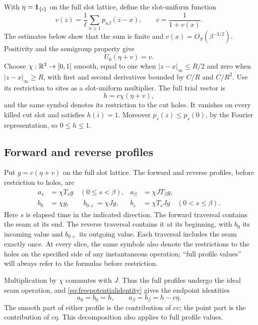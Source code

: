With $\eta=\mathbf 1_{\{i\}}$ on the full slot lattice, define the
slot-uniform function
\begin{equation}\label{eq:freepotential}
 v(z)=\frac1\ell\sum_{n\ge1}p_{n\beta}(z-x),
 \qquad c=\frac1{1+v(x)}.
\end{equation}
The estimates below show that the sum is finite and
$v(x)=O_S(\beta^{-3/2})$.  Positivity and the semigroup property give
\begin{equation}\label{eq:freepotentialidentity}
 U_0(\eta+v)=v.
\end{equation}
Choose $\chi:\mathbb R^3\to[0,1]$ smooth, equal to one when
$|z-x|_\infty\le R/2$ and zero when $|z-x|_\infty\ge R$, with
first and second derivatives bounded by $C/R$ and $C/R^2$.
Use its restriction to sites as a slot-uniform
multiplier.  The full trial vector is
\begin{equation}\label{eq:trialvector}
 h=c\chi(\eta+v),
\end{equation}
and the same symbol denotes its restriction to the cut holes.
It vanishes on every killed cut slot and satisfies $h(i)=1$.
Moreover $p_s(z)\le p_s(0)$, by the Fourier representation, so
$0\le h\le1$.

\subsection{Forward and reverse profiles}

Put $g=c(\eta+v)$ on the full slot lattice.  The forward and reverse
profiles, before restriction to holes, are
\begin{align}
 a_s&=\chi T_s g\quad(0\le s<\beta),
 &a_\beta&=\chi JT_\beta g,                         \label{eq:forwardprofile}\\
 b_0&=\chi g,\qquad b_{0+}=\chi Jg,
 &b_s&=\chi T_sJg\quad(0<s\le\beta).                 \label{eq:reverseprofile}
\end{align}
Here $s$ is elapsed time in the indicated direction.  The forward
traversal contains the seam at its end.  The reverse traversal contains
it at its beginning, with $b_0$ its incoming value and $b_{0+}$ its
outgoing value.  Each traversal includes the seam exactly once.
At every slice, the same symbols also denote the restrictions to the
holes on the specified side of any instantaneous operation; ``full
profile values'' will always refer to the formulas before restriction.

Multiplication by $\chi$ commutes with $J$.  Thus the full profiles
undergo the ideal seam operation, and \eqref{eq:freepotentialidentity}
gives the endpoint identities
\begin{equation}\label{eq:profileendpoints}
 a_0=b_0=h,\qquad a_\beta=b_\beta=h-c\eta.
\end{equation}
The smooth part of either profile is the contribution of $cv$;
the point part is the contribution of $c\eta$.  This decomposition
also applies to full profile values.


